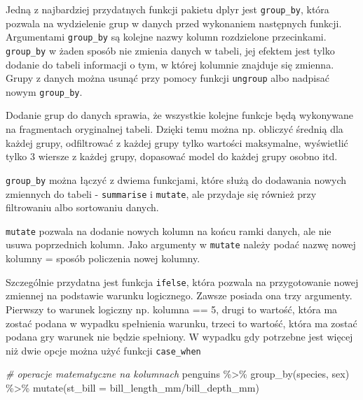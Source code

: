 \documentclass[
]{book}
\newenvironment{Shaded}{\begin{snugshade}}{\end{snugshade}}
\newcommand{\AttributeTok}[1]{\textcolor[rgb]{0.77,0.63,0.00}{#1}}
\newcommand{\CommentTok}[1]{\textcolor[rgb]{0.56,0.35,0.01}{\textit{#1}}}
\newcommand{\FunctionTok}[1]{\textcolor[rgb]{0.00,0.00,0.00}{#1}}
\newcommand{\NormalTok}[1]{#1}
\newcommand{\SpecialCharTok}[1]{\textcolor[rgb]{0.00,0.00,0.00}{#1}}
\begin{document}
Jedną z najbardziej przydatnych funkcji pakietu dplyr jest \texttt{group\_by}, która pozwala na wydzielenie grup w danych przed wykonaniem następnych funkcji. Argumentami \texttt{group\_by} są kolejne nazwy kolumn rozdzielone przecinkami. \texttt{group\_by} w żaden sposób nie zmienia danych w tabeli, jej efektem jest tylko dodanie do tabeli informacji o tym, w której kolumnie znajduje się zmienna. Grupy z danych można usunąć przy pomocy funkcji \texttt{ungroup} albo nadpisać nowym \texttt{group\_by}.

Dodanie grup do danych sprawia, że wszystkie kolejne funkcje będą wykonywane na fragmentach oryginalnej tabeli. Dzięki temu można np. obliczyć średnią dla każdej grupy, odfiltrować z każdej grupy tylko wartości maksymalne, wyświetlić tylko 3 wiersze z każdej grupy, dopasować model do każdej grupy osobno itd.

\texttt{group\_by} można łączyć z dwiema funkcjami, które służą do dodawania nowych zmiennych do tabeli - \texttt{summarise} i \texttt{mutate}, ale przydaje się również przy filtrowaniu albo sortowaniu danych.

\texttt{mutate} pozwala na dodanie nowych kolumn na końcu ramki danych, ale nie usuwa poprzednich kolumn. Jako argumenty w \texttt{mutate} należy podać nazwę nowej kolumny = sposób policzenia nowej kolumny.

Szczególnie przydatna jest funkcja \texttt{ifelse}, która pozwala na przygotowanie nowej zmiennej na podstawie warunku logicznego. Zawsze posiada ona trzy argumenty. Pierwszy to warunek logiczny np. kolumna == 5, drugi to wartość, która ma zostać podana w wypadku spełnienia warunku, trzeci to wartość, która ma zostać podana gry warunek nie będzie spełniony. W wypadku gdy potrzebne jest więcej niż dwie opcje można użyć funkcji \texttt{case\_when}

\begin{Shaded}
\begin{Highlighting}[]
\CommentTok{\# operacje matematyczne na kolumnach}
\NormalTok{penguins }\SpecialCharTok{\%\textgreater{}\%} \FunctionTok{group\_by}\NormalTok{(species, sex) }\SpecialCharTok{\%\textgreater{}\%} \FunctionTok{mutate}\NormalTok{(}\AttributeTok{st\_bill =}\NormalTok{ bill\_length\_mm}\SpecialCharTok{/}\NormalTok{bill\_depth\_mm)}
\end{Highlighting}
\end{Shaded}
\end{document}
